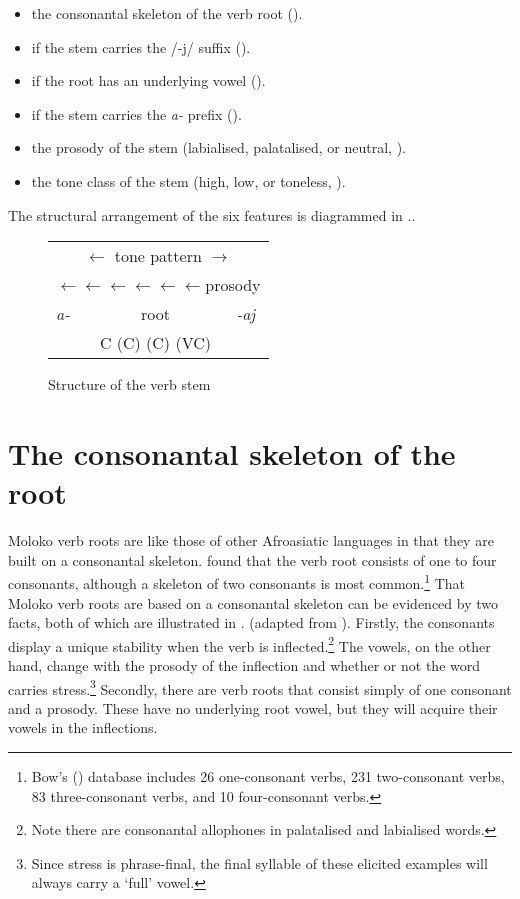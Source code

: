 \begin{itemize}
\item the consonantal skeleton of the verb root ().
\item if the stem carries the /-j/ suffix ().  
\item if the root has an underlying vowel (). 
\item if the stem carries the \textit{a-} prefix ().  
\item the prosody of the stem (labialised, palatalised, or neutral, ). 
\item the tone class of the stem (high, low, or toneless, ). 
\end{itemize}

The structural arrangement of the six features is diagrammed in .. 

\begin{figure}
\begin{tabular}{l|c|l}

\multicolumn{3}{c}{$\leftarrow$ \hfill   tone pattern \hfill  $\rightarrow$}\\
\multicolumn{3}{c}{$\leftarrow\leftarrow\leftarrow\leftarrow\leftarrow\leftarrow$\hfill prosody}\\
\cline{2-2}
\itshape a- & root & \itshape -aj\\
            & C (C) (C) (VC) &   \\\cline{2-2}
\end{tabular}
\caption{Structure of the verb stem}\label{fig:10}
\end{figure}

\section{The consonantal skeleton of the root}\label{sec:6.2}
\hypertarget{RefHeading1211921525720847}{}
Moloko verb roots are like those of other Afroasiatic languages in that they are built on a consonantal skeleton. \citet{Bow1997c} found that the verb root consists of one to four consonants, although a skeleton of two consonants is most common.\footnote{Bow’s (\citeyear{Bow1997c}) database includes 26 one-consonant verbs, 231 two-consonant verbs, 83 three-consonant verbs, and 10 four-consonant verbs. } That Moloko verb roots are based on a consonantal skeleton can be evidenced by two facts, both of which are illustrated in . (adapted from \citealt{Bow1997c}). Firstly, the consonants display a unique stability when the verb is inflected.\footnote{Note there are consonantal allophones in palatalised and labialised words. } The vowels, on the other hand, change with the prosody of the inflection and whether or not the word carries stress.\footnote{Since stress is phrase-final, the final syllable of these elicited examples will always carry a ‘full’ vowel.} Secondly, there are verb roots that consist simply of one consonant and a prosody. These have no underlying root vowel, but they will acquire their vowels in the inflections. 

